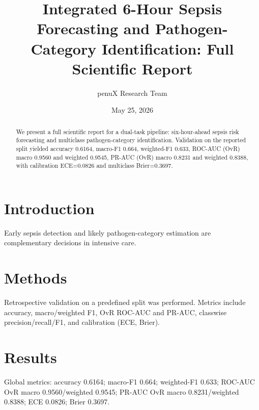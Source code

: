\documentclass[11pt]{article}
\title{Integrated 6-Hour Sepsis Forecasting and Pathogen-Category Identification: Full Scientific Report}
\author{penuX Research Team}
\date{May 25, 2026}
\begin{document}
\maketitle
\begin{abstract}
We present a full scientific report for a dual-task pipeline: six-hour-ahead sepsis risk forecasting and multiclass pathogen-category identification. Validation on the reported split yielded accuracy 0.6164, macro-F1 0.664, weighted-F1 0.633, ROC-AUC (OvR) macro 0.9560 and weighted 0.9545, PR-AUC (OvR) macro 0.8231 and weighted 0.8388, with calibration ECE=0.0826 and multiclass Brier=0.3697.
\end{abstract}
\section{Introduction}
Early sepsis detection and likely pathogen-category estimation are complementary decisions in intensive care.
\section{Methods}
Retrospective validation on a predefined split was performed. Metrics include accuracy, macro/weighted F1, OvR ROC-AUC and PR-AUC, classwise precision/recall/F1, and calibration (ECE, Brier).
\section{Results}
Global metrics: accuracy 0.6164; macro-F1 0.664; weighted-F1 0.633; ROC-AUC OvR macro 0.9560/weighted 0.9545; PR-AUC OvR macro 0.8231/weighted 0.8388; ECE 0.0826; Brier 0.3697.
\end{document}
